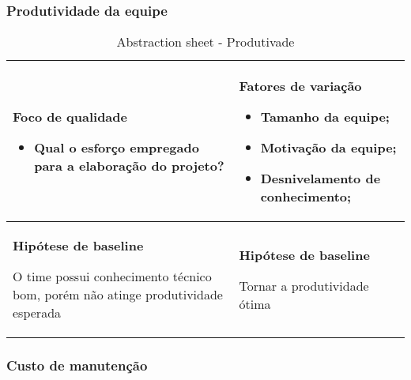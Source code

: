 \subsubsection{Produtividade da equipe}

\begin{table}[H]
\centering
\begin{tabular}{|p{4cm}|p{4cm}|}
\hline
	\begin{center}
	\textbf{Foco de qualidade}
	\end{center}

	\begin{itemize}
		\item Qual o esforço empregado para a elaboração do projeto?
	\end{itemize}

	&

	\begin{center}
	\textbf{Fatores de variação}
	\end{center}

	\begin{itemize}
		\item{Tamanho da equipe;}
		\item{Motivação da equipe;}
		\item{Desnivelamento de conhecimento;}
	\end{itemize}

	\\ \hline
	\begin{center}
	\textbf{Hipótese de baseline}
	\end{center}
 	O time possui conhecimento técnico bom, porém não atinge produtividade esperada

	&

	\begin{center}
	\textbf{Hipótese de baseline}
	\end{center}
	Tornar a produtividade ótima

	\\ \hline
\end{tabular}
\caption{Abstraction sheet - Produtivade}
\label{tab:produtividade_sheet}
\end{table}

\subsubsection{Custo de manutenção}

